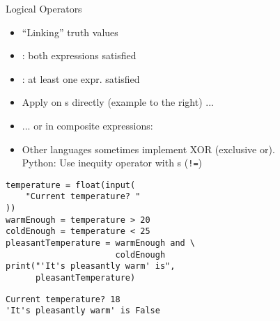 \begin{frame}[fragile]
%
\begin{minipage}[t]{.49\linewidth}
\begin{Large}
Logical Operators
\vspace{6pt}
\end{Large}
\begin{itemize}
\item \enquote{Linking} truth values
\item {}: both expressions satisfied
\item {}: at least one expr. satisfied
\item Apply on s directly (example to the right) ...
\item ... or in composite expressions:\\
\item Other languages sometimes implement XOR (exclusive or).\\
	Python: Use inequity operator with s (\texttt{!=})
\end{itemize}
\end{minipage}
%
\begin{minipage}[t]{.49\linewidth}
\phantom{x}
\begin{codebox}
\begin{verbatim}
temperature = float(input(
    "Current temperature? "
))
warmEnough = temperature > 20
coldEnough = temperature < 25
pleasantTemperature = warmEnough and \
                      coldEnough
print("'It's pleasantly warm' is",
      pleasantTemperature)
\end{verbatim}
\end{codebox}
\begin{cmdbox}
\begin{verbatim}
Current temperature? 18
'It's pleasantly warm' is False
\end{verbatim}
\end{cmdbox}
\end{minipage}
%
\end{frame}


